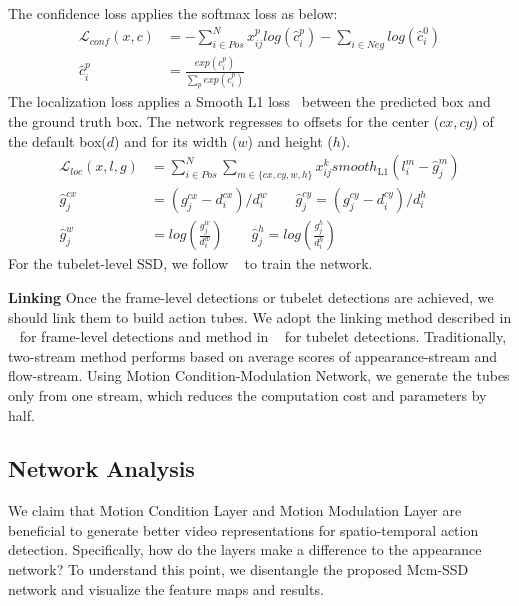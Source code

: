 \documentclass[10pt,twocolumn,letterpaper]{article}
\begin{document}
The confidence loss applies the softmax loss as below:
\begin{equation}
\begin{aligned}
\mathcal{L}_{conf}(x,c) &= -\sum_{i\in{Pos}}^{N}x_{ij}^{p}log(\hat{c}_{i}^{p})-\sum_{i\in{Neg}}log(\hat{c}_{i}^{0}) \\
\hat{c}_{i}^{p} &=\frac{exp(c_{i}^{p})}{\sum_{p}exp(c_{i}^{p})}
\end{aligned}
\end{equation}
The localization loss applies a Smooth L1 loss~\cite{Girshick2015} between the predicted box and the ground truth box. The network regresses to offsets for the center ($cx,cy$) of the default box($d$) and for its width ($w$) and height ($h$).
\begin{equation}
\begin{aligned}
\mathcal{L}_{loc}(x,l,g) &=\sum_{i\in{Pos}}^{N}\sum_{m\in\{cx,cy,w,h\}}x_{ij}^{k}smooth_{\mathrm{L}1}(l_{i}^{m}-\hat{g}_{j}^{m}) \\
\hat{g}_{j}^{cx} &= (g_{j}^{cx}-d_{i}^{cx})/d_{i}^{w} \qquad
\hat{g}_{j}^{cy} = (g_{j}^{cy}-d_{i}^{cy})/d_{i}^{h} \\
\hat{g}_{j}^{w} &= log (\frac{{g}_{j}^{w}}{d_{i}^{w}}) \qquad \hat{g}_{j}^{h} = log (\frac{{g}_{j}^{h}}{d_{i}^{h}})
\end{aligned}
\end{equation}
For the tubelet-level SSD, we follow ~\cite{Kalogeithon2017} to train the network.

{\bf{Linking}} Once the frame-level detections or tubelet detections are achieved, we should link them to build action tubes. We adopt the linking method described in ~\cite{Singh2017} for frame-level detections and method in ~\cite{Kalogeithon2017} for tubelet detections. Traditionally, two-stream method performs based on average scores of appearance-stream and flow-stream. Using Motion Condition-Modulation Network, we generate the tubes only from one stream, which reduces the computation cost and parameters by half.  

\subsection{Network Analysis}
We claim that Motion Condition Layer and Motion Modulation Layer are beneficial to generate better video representations for spatio-temporal action detection. Specifically, how do the layers make a difference to the appearance network? To understand this point, we disentangle the proposed Mcm-SSD network and visualize the feature maps and results. 
\end{document}
